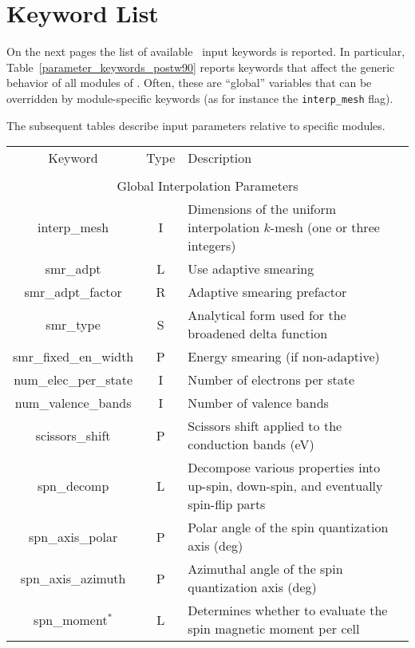 \section{Keyword List}
On the next pages the list of available
\postw\ input keywords is reported.
In particular, Table~\ref{parameter_keywords_postw90} reports keywords
that affect the generic behavior of all modules of
\postw. Often, these are ``global'' variables that can be overridden
by module-specific keywords (as for instance the {\tt interp\_mesh} flag).

The subsequent tables describe input parameters relative to specific modules.

\clearpage

\begin{table}[hH!]
\begin{center}
\begin{tabular}{|c|c|p{6cm}|}
  \hline
  Keyword & Type & Description \\
  &      &             \\
  \hline\hline
  \multicolumn{3}{|c|}{Global Interpolation Parameters} \\
  \hline
  {\sc interp\_mesh}   & I & Dimensions of the uniform interpolation $k$-mesh 
(one or three integers) \\
  {\sc smr\_adpt}   & L & Use adaptive smearing\\
  {\sc smr\_adpt\_factor}   & R & Adaptive smearing prefactor\\
  {\sc smr\_type}   & S &  Analytical form used for the broadened delta function\\
  {\sc smr\_fixed\_en\_width}   & P & Energy smearing (if non-adaptive)\\
  {\sc num\_elec\_per\_state}   & I & Number of electrons per state \\
  {\sc num\_valence\_bands}   & I & Number of valence bands \\
  {\sc scissors\_shift}   & P & Scissors shift applied to the conduction bands (eV) \\
  {\sc spn\_decomp}& L & Decompose various properties into
  up-spin, down-spin, and eventually spin-flip parts\\
  {\sc spn\_axis\_polar}& P & Polar angle of the spin quantization axis (deg)\\
  {\sc spn\_axis\_azimuth}& P & Azimuthal angle of the spin quantization axis (deg)\\
  {\sc spn\_moment}$^*$& L & Determines whether to evaluate the spin 
magnetic moment per cell\\  \hline

\end{tabular}
\end{center}
\end{table}
